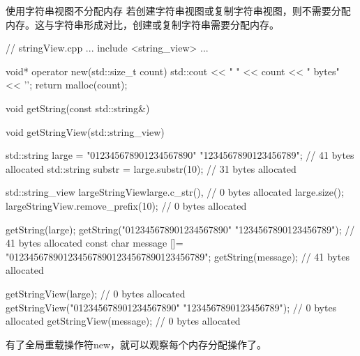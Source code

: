 \begin{myTip}{使用字符串视图不分配内存}
若创建字符串视图或复制字符串视图，则不需要分配内存。这与字符串形成对比，创建或复制字符串需要分配内存。


\begin{cpp}
// stringView.cpp
...
include <string_view>
...

void* operator new(std::size_t count){
	std::cout << " " << count << " bytes" << '\n';
	return malloc(count);
}

void getString(const std::string&){}

void getStringView(std::string_view){}

std::string large = "012345678901234567890"
					"1234567890123456789"; // 41 bytes allocated
std::string substr = large.substr(10); // 31 bytes allocated

std::string_view largeStringView{large.c_str(), // 0 bytes allocated
								large.size()};
largeStringView.remove_prefix(10); // 0 bytes allocated

getString(large);
getString("012345678901234567890"
		  "1234567890123456789"); // 41 bytes allocated
const char message []= "0123456789012345678901234567890123456789";
getString(message); // 41 bytes allocated

getStringView(large); // 0 bytes allocated
getStringView("012345678901234567890"
			  "1234567890123456789"); // 0 bytes allocated
getStringView(message); // 0 bytes allocated
\end{cpp}

有了全局重载操作符new，就可以观察每个内存分配操作了。

\end{myTip}
























